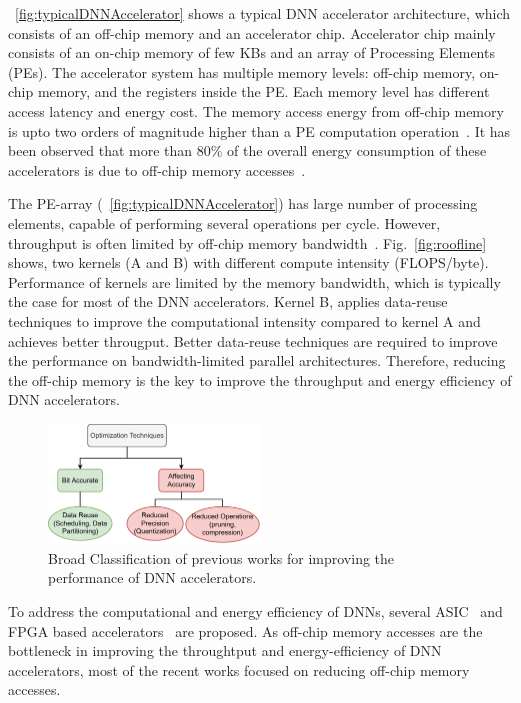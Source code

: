 \documentclass[a4paper,10pt]{article}
\begin{document}
\figurename{~\ref{fig:typicalDNNAccelerator}} shows a typical DNN accelerator architecture, which consists of an off-chip memory and an accelerator chip. Accelerator chip mainly consists of an on-chip memory of few KBs and an array of Processing Elements (PEs). The accelerator system has multiple memory levels: off-chip memory, on-chip memory, and the registers inside the PE. Each memory level has different access latency and energy cost. The memory access energy from off-chip memory is upto two orders of magnitude higher than a PE computation operation~\cite{Chen2016EyerissAS}. It has been observed that more than 80\% of the overall energy consumption of these accelerators is due to off-chip memory accesses~\cite{chen2014diannao}. 

The PE-array (\figurename{~\ref{fig:typicalDNNAccelerator}}) has large number of processing elements, capable of performing several operations per cycle. However, throughput is often limited by off-chip memory bandwidth~\cite{williams2009roofline}. Fig.~\ref{fig:roofline} shows, two kernels (A and B) with different compute intensity (FLOPS/byte). Performance of kernels are limited by the memory bandwidth, which is typically the case for most of the DNN accelerators. Kernel B, applies data-reuse techniques to improve the computational intensity compared to kernel A and achieves better througput. Better data-reuse techniques are required to improve the performance on bandwidth-limited parallel architectures. Therefore, reducing the off-chip memory is the key to improve the throughput and energy efficiency of DNN accelerators. 

\begin{figure}[!htb]
	\centering
	\includegraphics[width=0.5\textwidth]{previousWorkClassification}
	\caption{Broad Classification of previous works for improving the performance of DNN accelerators.}
	\label{fig:previousWorkClassification}
\end{figure}
To address the computational and energy efficiency of DNNs, several ASIC~\cite{conti2018chipmunk,wang2017accelerating,azari2020elsa} and FPGA based accelerators~\cite{chang2015recurrent,ferreira2016fpga,lee2016fpga,guan2017fpga,han2017ese} are proposed. As off-chip memory accesses are the bottleneck in improving the throughtput and energy-efficiency of DNN accelerators, most of the recent works focused on reducing off-chip memory accesses. 
\end{document}
